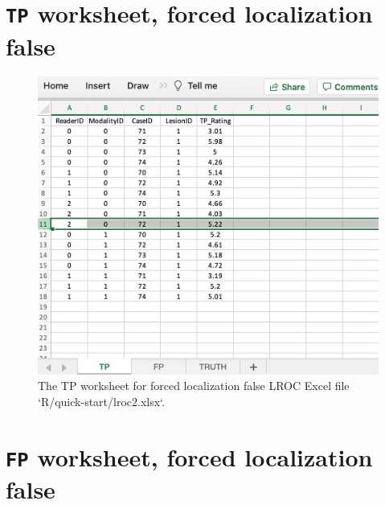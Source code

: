 \documentclass[
]{book}
\begin{document}
\hypertarget{quick-start-lroc-tp2}{%
\section{\texorpdfstring{\texttt{TP} worksheet, forced localization false}{TP worksheet, forced localization false}}\label{quick-start-lroc-tp2}}

\begin{figure}

{\centering \includegraphics[width=1\linewidth]{images/quick-start/lroc2TP} 

}

\caption{The TP worksheet for forced localization false LROC Excel file `R/quick-start/lroc2.xlsx`.}\label{fig:quick-start-lroc-tp2}
\end{figure}

\hypertarget{quick-start-lroc-fp2}{%
\section{\texorpdfstring{\texttt{FP} worksheet, forced localization false}{FP worksheet, forced localization false}}\label{quick-start-lroc-fp2}}
\end{document}
